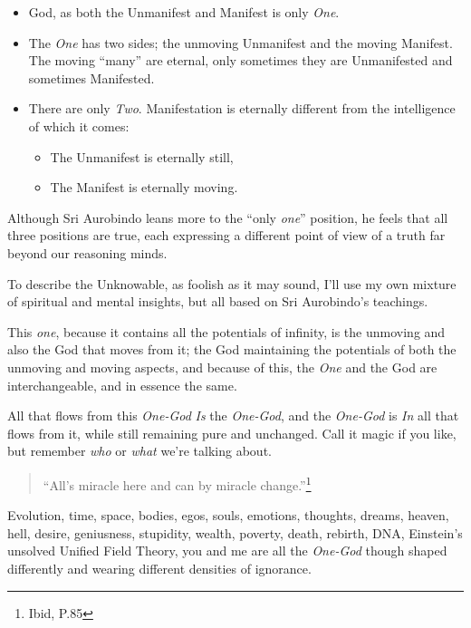 \documentclass[12pt,a4paper]{book}
\begin{document}
\label{label1}
\begin{itemize}
\renewcommand{\labelitemi}{$\diamond$}
\item God, as both the Unmanifest and Manifest is only \emph{One}.

\item The \emph{One} has two sides; the unmoving Unmanifest and the
  moving Manifest. The moving ``many'' are eternal, only sometimes they
  are Unmanifested and sometimes Manifested.

\item There are only \emph{Two}. Manifestation is eternally different
  from the intelligence of which it comes:

\begin{itemize}
\item The Unmanifest is eternally still,

\item The Manifest is eternally moving.
\end{itemize}

\end{itemize}

Although Sri Aurobindo leans more to the ``only \emph{one}'' position, he
feels that all three positions are true, each expressing a different
point of view of a truth far beyond our reasoning minds.

To describe the Unknowable, as foolish as it may sound, I'll use my
own mixture of spiritual and mental insights, but all based on Sri
Aurobindo's teachings.

This \emph{one}, because it contains all the potentials of infinity,
is the unmoving and also the God that moves from it; the God
maintaining the potentials of both the unmoving and moving aspects,
and because of this, the \emph{One} and the God are interchangeable,
and in essence the same.

All that flows from this \emph{One-God} \emph{Is} the \emph{One-God},
and the \emph{One-God} is \emph{In} all that flows from it, while
still remaining pure and unchanged. Call it magic if you like, but
remember \emph{who} or \emph{what} we're talking about.


\begin{verse}
``All's miracle here and can by miracle change.''\footnote{Ibid,
  P.85}
\end{verse}

Evolution, time, space, bodies, egos, souls, emotions, thoughts,
dreams, heaven, hell, desire, geniusness, stupidity, wealth, poverty,
death, rebirth, DNA, Einstein's unsolved Unified Field Theory, you and
me are all the \emph{One-God} though shaped differently and wearing
different densities of ignorance.
\end{document}
